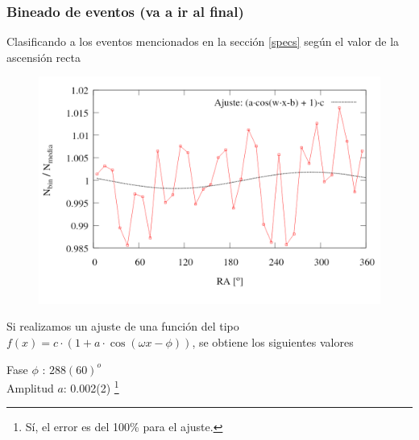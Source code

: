 		


	\subsubsection{Bineado de eventos  (va a ir al final)}

Clasificando a los eventos mencionados en la sección \ref{specs} según el valor de la ascensión recta
\begin{figure}[H]
	\centering
	\includegraphics[width=\linewidth]{bineado_eventos_herald_por_RA.png}
	\caption{}
\end{figure}

Si realizamos un ajuste de una función del tipo $f(x) = c\cdot(1 + a\cdot\cos{(\omega x - \phi)})$, se obtiene los siguientes valores
		
	Fase $\phi$ : $288(60)^o$  \\
	Amplitud $a$: 0.002(2) \footnote{Sí, el error es del 100\% para el ajuste.}  	 \\
		
